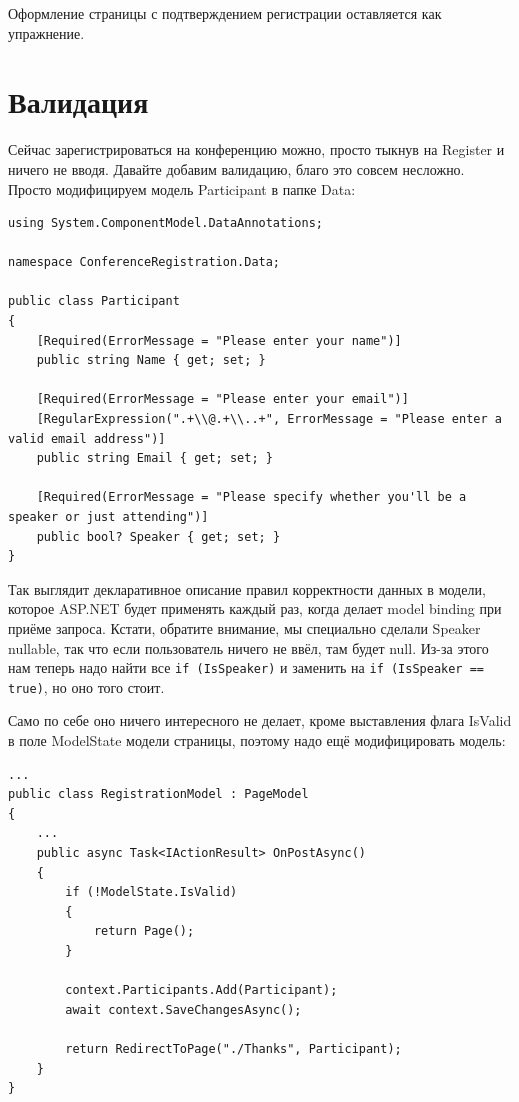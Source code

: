 \documentclass[a5paper]{article}
\begin{document}
Оформление страницы с подтверждением регистрации оставляется как упражнение.

\section{Валидация}

Сейчас зарегистрироваться на конференцию можно, просто тыкнув на Register и ничего не вводя. Давайте добавим валидацию, благо это совсем несложно. Просто модифицируем модель Participant в папке Data:

\begin{verbatim}
using System.ComponentModel.DataAnnotations;

namespace ConferenceRegistration.Data;

public class Participant
{
    [Required(ErrorMessage = "Please enter your name")]
    public string Name { get; set; }

    [Required(ErrorMessage = "Please enter your email")]
    [RegularExpression(".+\\@.+\\..+", ErrorMessage = "Please enter a valid email address")]
    public string Email { get; set; }

    [Required(ErrorMessage = "Please specify whether you'll be a speaker or just attending")]
    public bool? Speaker { get; set; }
}
\end{verbatim}

Так выглядит декларативное описание правил корректности данных в модели, которое ASP.NET будет применять каждый раз, когда делает model binding при приёме запроса. Кстати, обратите внимание, мы специально сделали Speaker nullable, так что если пользователь ничего не ввёл, там будет null. Из-за этого нам теперь надо найти все \texttt{if (IsSpeaker)} и заменить на \texttt{if (IsSpeaker == true)}, но оно того стоит.

Само по себе оно ничего интересного не делает, кроме выставления флага IsValid в поле ModelState модели страницы, поэтому надо ещё модифицировать модель:

\begin{verbatim}
...
public class RegistrationModel : PageModel
{
    ...
    public async Task<IActionResult> OnPostAsync()
    {
        if (!ModelState.IsValid)
        {
            return Page();
        }

        context.Participants.Add(Participant);
        await context.SaveChangesAsync();

        return RedirectToPage("./Thanks", Participant);
    }
}
\end{verbatim}
\end{document}
